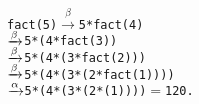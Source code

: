 \begin{alltt}
fact(5) \(\xrightarrow{\beta}\) 5 * fact(4)
        \(\smashedrightarrow{\beta}\) 5 * (4 * fact(3))
        \(\smashedrightarrow{\beta}\) 5 * (4 * (3 * fact(2)))
        \(\smashedrightarrow{\beta}\) 5 * (4 * (3 * (2 * fact(1))))
        \(\smashedrightarrow{\alpha}\) 5 * (4 * (3 * (2 * (1))))    \(=\) 120\textrm{.}
\end{alltt}

